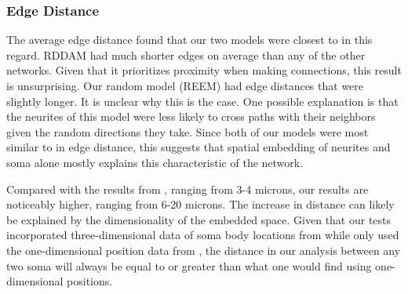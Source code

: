 \subsubsection{Edge Distance} 
The average edge distance found that our two models were closest to \ce in this regard. 
RDDAM had much shorter edges on average than any of the other networks. 
Given that it prioritizes proximity when making connections, this result is unsurprising. 
Our random model (REEM) had edge distances that were slightly longer. 
It is unclear why this is the case. 
One possible explanation is that the neurites of this model were less likely to cross paths with their neighbors given the random directions they take.
Since both of our models were most similar to \ce in edge distance, this suggests that spatial embedding of neurites and soma alone mostly explains this characteristic of the network. 

Compared with the results from \cite{Itzhack}, ranging from 3-4 microns, our results are noticeably higher, ranging from 6-20 microns. 
The increase in distance can likely be explained by the dimensionality of the embedded space. 
Given that our tests incorporated three-dimensional data of soma body locations from \cite{Skuhersky} while \cite{Itzhack} only used the one-dimensional position data from \cite{WormAtlas2009}, the distance in our analysis between any two soma will always be equal to or greater than what one would find using one-dimensional positions.

